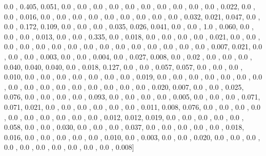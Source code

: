 \documentclass[usenames,dvipsnames]{article} %
\begin{document}
0.0  , 0.405, 0.051, 0.0  , 0.0  , 0.0  , 0.0  , 0.0  , 0.0  , 0.0  , 0.0  , 0.0  , 0.0  , 0.022, 0.0  , 0.0  , 0.016, 0.0  , 0.0  , 0.0  , 0.0  , 0.0  , 0.0  , 0.0  , 0.0  , 0.0  , 0.032, 0.021, 0.047, 0.0  , 0.0  , 0.172, 0.109, 0.0  , 0.0  , 0.0  , 0.035, 0.026, 0.041, 0.0  , 0.0  , 1.0  , 0.060, 0.0  , 0.0  , 0.0  , 0.013, 0.0  , 0.0  , 0.335, 0.0  , 0.018, 0.0  , 0.0  , 0.0  , 0.0  , 0.021, 0.0  , 0.0  , 0.0  , 0.0  , 0.0  , 0.0  , 0.0  , 0.0  , 0.0  , 0.0  , 0.0  , 0.0  , 0.0  , 0.0  , 0.0  , 0.007, 0.021, 0.0  , 0.0  , 0.0  , 0.003, 0.0  , 0.0  , 0.004, 0.0  , 0.027, 0.008, 0.0  , 0.02 , 0.0  , 0.0  , 0.0  , 0.040, 0.040, 0.040, 0.0  , 0.018, 0.127, 0.0  , 0.0  , 0.057, 0.057, 0.0  , 0.0  , 0.0  , 0.010, 0.0  , 0.0  , 0.0  , 0.0  , 0.0  , 0.0  , 0.0  , 0.019, 0.0  , 0.0  , 0.0  , 0.0  , 0.0  , 0.0  , 0.0  , 0.0  , 0.0  , 0.0  , 0.0  , 0.0  , 0.0  , 0.0  , 0.0  , 0.0  , 0.020, 0.007, 0.0  , 0.0  , 0.025, 0.076, 0.0  , 0.0  , 0.0  , 0.0  , 0.093, 0.0  , 0.0  , 0.0  , 0.0  , 0.005, 0.0  , 0.0  , 0.0  , 0.071, 0.071, 0.021, 0.0  , 0.0  , 0.0  , 0.0  , 0.0  , 0.0  , 0.011, 0.008, 0.076, 0.0  , 0.0  , 0.0  , 0.0  , 0.0  , 0.0  , 0.0  , 0.0  , 0.0  , 0.0  , 0.012, 0.012, 0.019, 0.0  , 0.0  , 0.0  , 0.0  , 0.0  , 0.058, 0.0  , 0.0  , 0.030, 0.0  , 0.0  , 0.0  , 0.037, 0.0  , 0.0  , 0.0  , 0.0  , 0.0  , 0.018, 0.016, 0.0  , 0.0  , 0.0  , 0.0  , 0.0  , 0.010, 0.0  , 0.003, 0.0  , 0.0  , 0.020, 0.0  , 0.0  , 0.0  , 0.0  , 0.0  , 0.0  , 0.0  , 0.0  , 0.0  , 0.0  , 0.008]
\end{document}
